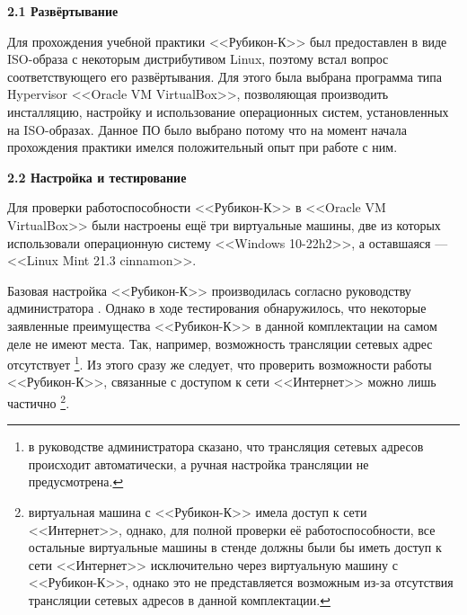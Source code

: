 \begin{center}
	\textbf{\Large 2.1 Развёртывание}
\end{center}

Для прохождения учебной практики <<Рубикон-К>> был предоставлен в виде ISO-образа с некоторым дистрибутивом Linux, поэтому встал вопрос соответствующего его развёртывания. Для этого была выбрана программа типа Hypervisor <<Oracle VM VirtualBox>>, позволяющая производить инсталляцию, настройку и использование операционных систем, установленных на ISO-образах. Данное ПО было выбрано потому что на момент начала прохождения практики имелся положительный опыт при работе с ним.

\begin{center}
	\textbf{\Large 2.2 Настройка и тестирование}
\end{center}

Для проверки работоспособности <<Рубикон-К>> в <<Oracle VM VirtualBox>> были настроены ещё три виртуальные машины, две из которых использовали операционную систему <<Windows 10-22h2>>, а оставшаяся --- <<Linux Mint 21.3 cinnamon>>.

Базовая настройка <<Рубикон-К>> производилась согласно руководству администратора \cite{doc}. Однако в ходе тестирования обнаружилось, что некоторые заявленные преимущества <<Рубикон-К>> в данной комплектации на самом деле не имеют места. Так, например, возможность трансляции сетевых адрес отсутствует \footnote{в руководстве администратора \cite{doc} сказано, что трансляция сетевых адресов происходит автоматически, а ручная настройка трансляции не предусмотрена.}. Из этого сразу же следует, что проверить возможности работы <<Рубикон-К>>, связанные с доступом к сети <<Интернет>> можно лишь частично \footnote{виртуальная машина с <<Рубикон-К>> имела доступ к сети <<Интернет>>, однако, для полной проверки её работоспособности, все остальные виртуальные машины в стенде должны были бы иметь доступ к сети <<Интернет>> исключительно через виртуальную машину с <<Рубикон-К>>, однако это не представляется возможным из-за отсутствия трансляции сетевых адресов в данной комплектации.}.

